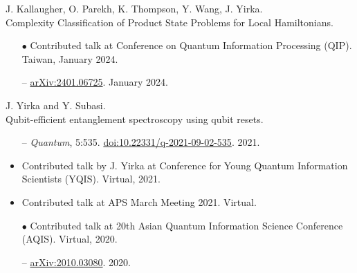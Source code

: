 \documentclass[11pt,letterpaper,serif]{moderncv}
\newcommand{\pubItemSep}{0em}
\begin{document}
J. Kallaugher, O. Parekh, K. Thompson, Y. Wang, J. Yirka.
\\Complexity Classification of Product State Problems for Local Hamiltonians.
\begin{adjustwidth}{.1in}{}
	\begin{itemize}[itemsep=\pubItemSep]
		\item[$\bullet$] Contributed talk at Conference on Quantum Information Processing (QIP). Taiwan, January 2024.
		\item[--] \href{https://arxiv.org/abs/2401.06725}{arXiv:2401.06725}. January 2024.
	\end{itemize}
\end{adjustwidth}
\vspace{\parsep}

J. Yirka and Y. Subasi.
\\Qubit-efficient entanglement spectroscopy using qubit resets.
\begin{adjustwidth}{.1in}{}
	\begin{itemize}[itemsep=\pubItemSep]
		\item[--] \textit{Quantum}, 5:535. \href{https://doi.org/10.22331/q-2021-09-02-535}{doi:10.22331/q-2021-09-02-535}. 2021.
		\item Contributed talk by J. Yirka at Conference for Young Quantum Information Scientists (YQIS). Virtual, 2021.
		\item Contributed talk at APS March Meeting 2021. Virtual.
		\item[$\bullet$] Contributed talk at 20th Asian Quantum Information Science Conference (AQIS). Virtual, 2020.
		\item[--] \href{https://arxiv.org/abs/2010.03080}{arXiv:2010.03080}. 2020.
	\end{itemize}
\end{adjustwidth}
\vspace{\parsep}
\end{document}
